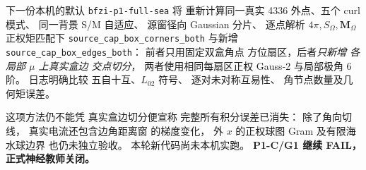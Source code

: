 下一份本机的默认
\texttt{bfzi-p1-full-sea} 将
重新计算同一真实
4336 外点、五个 curl 模式、
同一背景 S/M 自适应、
源窗径向 Gaussian 分片、
逐点解析 $4\pi,S_\Omega,\bm M_\Omega$
正权矩匹配下
\texttt{source\_cap\_box\_corners\_both}
与新增
\texttt{source\_cap\_box\_edges\_both}：
前者只用固定双盒角点
方位扇区，后者\emph{只新增
各局部 $\mu$ 上真实盒边
交点切分}，
两者使用相同每扇区正权
Gauss-2 与局部极角 6 阶。
日志明确比较
五自十互、$L_{02}$ 符号、
逐对未对称互易性、
角节点数量及几何矩误差。

这项方法仍不能凭
真实盒边切分便宣称
完整所有积分误差已消失：
除了角向切线，
真实电流还包含边角距离窗
的梯度变化，
外 $x$ 的正权球图 Gram
及有限海水球边界
也仍未独立验收。
本轮新代码尚未本机实跑。
\textbf{P1-C/G1 继续 FAIL，
正式神经教师关闭。}
